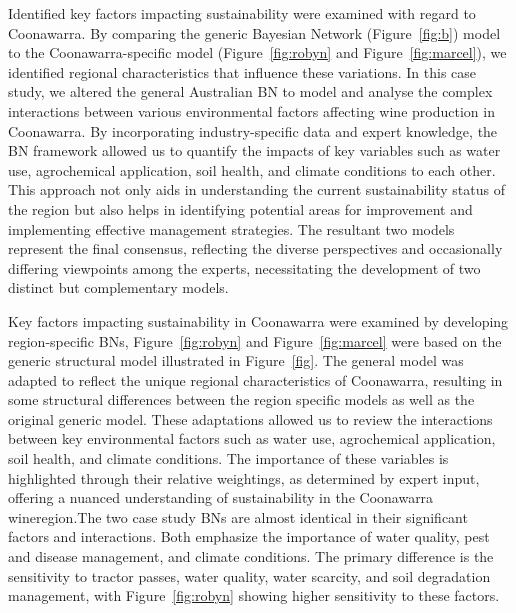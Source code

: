 \documentclass[fleqn,10pt]{wlscirep}
\begin{document}
Identified key factors impacting sustainability were examined with regard to Coonawarra. By comparing the generic Bayesian Network (Figure~\ref{fig:b}) model to the Coonawarra-specific model (Figure~\ref{fig:robyn} and Figure~\ref{fig:marcel}), we identified regional characteristics that influence these variations. In this case study, we altered the general Australian BN to model and analyse the complex interactions between various environmental factors affecting wine production in Coonawarra. By incorporating industry-specific data and expert knowledge, the BN framework allowed us to quantify the impacts of key variables such as water use, agrochemical application, soil health, and climate conditions to each other. This approach not only aids in understanding the current sustainability status of the region but also helps in identifying potential areas for improvement and implementing effective management strategies. The resultant two models represent the final consensus, reflecting the diverse perspectives and occasionally differing viewpoints among the experts, necessitating the development of two distinct but complementary models.

Key factors impacting sustainability in Coonawarra were examined by developing region-specific BNs, Figure~\ref{fig:robyn} and Figure~\ref{fig:marcel} were based on the generic structural model illustrated in Figure~\ref{fig}. The general model was adapted to reflect the unique regional characteristics of Coonawarra, resulting in some structural differences between the region specific models as well as the original generic model. These adaptations allowed us to review the interactions between key environmental factors such as water use, agrochemical application, soil health, and climate conditions. The importance of these variables is highlighted through their relative weightings, as determined by expert input, offering a nuanced understanding of sustainability in the Coonawarra wineregion.The two case study BNs are almost identical in their significant factors and interactions. Both emphasize the importance of water quality, pest and disease management, and climate conditions. The primary difference is the sensitivity to tractor passes, water quality, water scarcity, and soil degradation management, with Figure~\ref{fig:robyn} showing higher sensitivity to these factors. 

\end{document}
